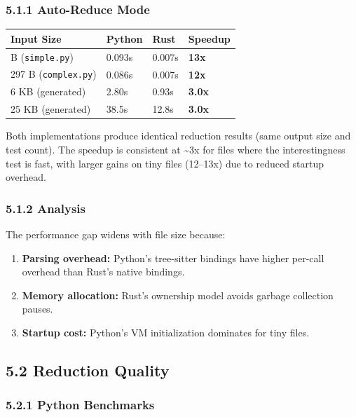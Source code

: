 \documentclass[
  letterpaper,
]{article}
\newcounter{none} %
\providecommand{\tightlist}{%
  \setlength{\itemsep}{0pt}\setlength{\parskip}{0pt}}
\begin{document}
\subsubsection{5.1.1 Auto-Reduce Mode}\label{auto-reduce-mode}

{\def\LTcaptype{none} %
\begin{longtable}[]{@{}llll@{}}
\toprule\noalign{}
Input Size & Python & Rust & Speedup \\
\midrule\noalign{}
\endhead
\bottomrule\noalign{}
\endlastfoot
60 B (\texttt{simple.py}) & 0.093s & 0.007s & \textbf{13x} \\
297 B (\texttt{complex.py}) & 0.086s & 0.007s & \textbf{12x} \\
6 KB (generated) & 2.80s & 0.93s & \textbf{3.0x} \\
25 KB (generated) & 38.5s & 12.8s & \textbf{3.0x} \\
\end{longtable}
}

Both implementations produce identical reduction results (same output
size and test count). The speedup is consistent at \textasciitilde3x for
files where the interestingness test is fast, with larger gains on tiny
files (12--13x) due to reduced startup overhead.

\subsubsection{5.1.2 Analysis}\label{analysis}

The performance gap widens with file size because:

\begin{enumerate}
\def\labelenumi{\arabic{enumi}.}
\tightlist
\item
  \textbf{Parsing overhead:} Python's tree-sitter bindings have higher
  per-call overhead than Rust's native bindings.
\item
  \textbf{Memory allocation:} Rust's ownership model avoids garbage
  collection pauses.
\item
  \textbf{Startup cost:} Python's VM initialization dominates for tiny
  files.
\end{enumerate}

\subsection{5.2 Reduction Quality}\label{reduction-quality}

\subsubsection{5.2.1 Python Benchmarks}\label{python-benchmarks}
\end{document}
